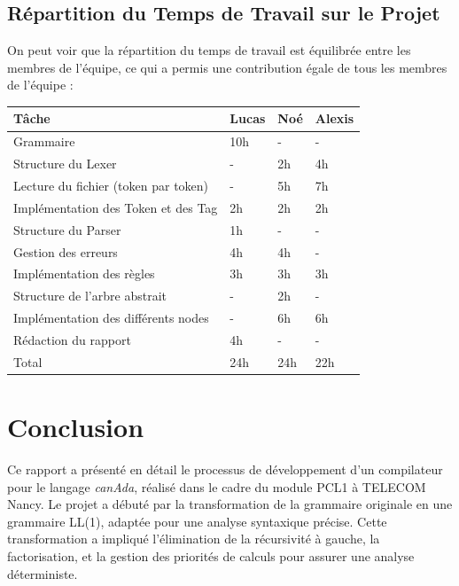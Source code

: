 \documentclass[french,a4paper]{article}
\begin{document}
    \subsection{Répartition du Temps de Travail sur le Projet}\label{subsec:repartition-du-temps-de-travail-sur-le-projet}

    On peut voir que la répartition du temps de travail est équilibrée entre les membres de l'équipe, ce qui a permis une contribution égale de tous les membres de l'équipe :
    \newline

    \begin{tabular}{@{}llll@{}}
        \toprule
        Tâche & Lucas & Noé & Alexis \\ \midrule
        Grammaire & 10h & - & - \\
        Structure du Lexer & - & 2h & 4h \\
        Lecture du fichier (token par token) & - & 5h & 7h \\
        Implémentation des Token et des Tag & 2h & 2h & 2h \\
        Structure du Parser & 1h & - & - \\
        Gestion des erreurs & 4h & 4h & - \\
        Implémentation des règles & 3h & 3h & 3h \\
        Structure de l'arbre abstrait & - & 2h & - \\
        Implémentation des différents nodes & - & 6h & 6h \\
        Rédaction du rapport & 4h & - & - \\
        \midrule
        Total & 24h & 24h & 22h \\ \bottomrule
    \end{tabular}

    \section{Conclusion}\label{sec:conclusion}
    Ce rapport a présenté en détail le processus de développement d'un compilateur pour le langage \textit{canAda}, réalisé dans le cadre du module PCL1 à TELECOM Nancy.
    Le projet a débuté par la transformation de la grammaire originale en une grammaire LL(1), adaptée pour une analyse syntaxique précise.
    Cette transformation a impliqué l'élimination de la récursivité à gauche, la factorisation, et la gestion des priorités de calculs pour assurer une analyse déterministe.
\end{document}
